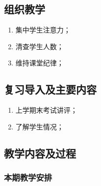 \jxhj{%
	}
\skrq{%
	}

\makeshouye %

\subsection{组织教学}
\begin{enumerate}[\hspace{2em}1、]
	\setlength{\itemsep}{0pt}
	\item 集中学生注意力；
	\item 清查学生人数；
	\item 维持课堂纪律；
\end{enumerate}
\subsection{复习导入及主要内容}
\begin{enumerate}[\hspace{2em}1、]
	\item 上学期末考试讲评；

	\item 了解学生情况；
\end{enumerate}
\subsection{教学内容及过程}
\subsubsection{本期教学安排} 
